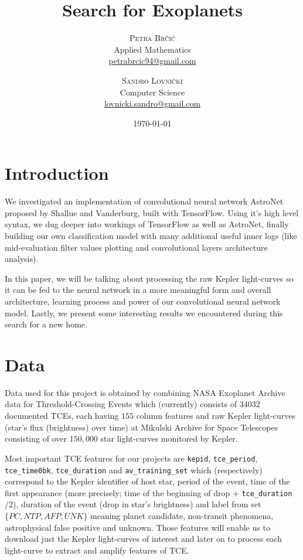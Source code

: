 \documentclass[twoside]{article}
\title{Search for Exoplanets} %
\author{%
\textsc{Petra Br\v{c}i\'c}\\%
\normalsize Applied Mathematics \\
\normalsize \href{mailto:petrabrcic94@gmail.com}{petrabrcic94@gmail.com} 
\and
\textsc{Sandro Lovni\v{c}ki}\\%
\normalsize Computer Science \\ 
\normalsize \href{mailto:lovnicki.sandro@gmail.com}{lovnicki.sandro@gmail.com}
}
\date{\today}
\newcommand{\code}[1]{\texttt{#1}}
\begin{document}
\maketitle
\tableofcontents
\newpage

\begin{multicols}{2}

\section{Introduction}
We investigated an implementation of convolutional neural network AstroNet proposed by Shallue and Vanderburg, built with TensorFlow. Using it's high level syntax, we dug deeper into workings of TensorFlow as well as AstroNet, finally building our own classification model with many additional useful inner logs (like mid-evaluation filter values plotting and convolutional layers architecture analysis).

In this paper, we will be talking about processing the raw Kepler light-curves so it can be fed to the neural network in a more meaningful form and overall architecture, learning process and power of our convolutional neural network model. Lastly, we present some interesting results we encountered during this search for a new home.

\section{Data}
Data used for this project is obtained by combining NASA Exoplanet Archive data for Threshold-Crossing Events which (currently) consists of $34032$ documented TCEs, each having $155$ column features and raw Kepler light-curves (star's flux (brightness) over time) at Mikulski Archive for Space Telescopes consisting of over $150,000$ star light-curves monitored by Kepler.

Most important TCE features for our projects are \code{kepid}, \code{tce\_period}, \code{tce\_time0bk}, \code{tce\_duration} and \code{av\_training\_set} which (respectively) correspond to the Kepler identifier of host star, period of the event, time of the first appearance (more precisely; time of the beginning of drop $+$ \code{tce\_duration}$/2$), duration of the event (drop in star's brightness) and label from set $\{PC,NTP,AFP,UNK\}$ meaning planet candidate, non-transit phenomena, astrophysical false positive and unknown. Those features will enable us to download just the Kepler light-curves of interest and later on to process each light-curve to extract and amplify features of TCE.


\end{multicols}
\end{document}
